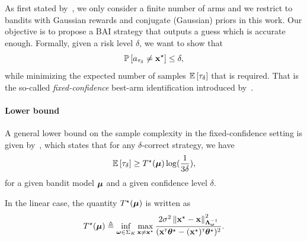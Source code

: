 As first stated by~\cite{soare2014linear}, we only consider a finite number of arms and we restrict to bandits  with Gaussian rewards and conjugate (Gaussian) priors in this work. Our objective is to propose a BAI strategy that outputs a guess which is accurate enough. Formally, given a risk level $\delta$, we want to show that
\[
  \mathbb{P}\left[a_{\tau_\delta}\neq {\bf x}^\star\right] \leq \delta,
\]
while minimizing the expected number of samples $\mathbb{E}\left[\tau_\delta\right]$ that is required. That is the so-called \emph{fixed-confidence} best-arm identification introduced by~\cite{even-dar2003confidence}.

\paragraph{Lower bound} A general lower bound on the sample complexity in the fixed-confidence setting is given by~\cite{garivier2016tracknstop}, which states that for any $\delta$-correct strategy, we have
\[
    \mathbb{E}\left[\tau_\delta\right] \geq T^\star({\boldsymbol \mu})\log(\frac{1}{3\delta}),
\]
for a given bandit model ${\boldsymbol \mu}$ and a given confidence level $\delta$. 

\begin{proposition}
In the linear case, the quantity $T^\star({\boldsymbol \mu})$ is written as
\[
  T^\star({\boldsymbol \mu}) \triangleq \inf_{{\boldsymbol \omega}\in\Sigma_K}\max_{{\bf x}\neq {\bf x}^\star} \frac{2\sigma^2\left\lVert{\bf x}^\star - {\bf x}\right\rVert^2_{{\boldsymbol \Lambda}_{{\boldsymbol \omega}}^{-1}}}{({\bf x}^\mathsf{\scriptscriptstyle T}{\boldsymbol \theta}^\star-({\bf x}^\star)^\mathsf{\scriptscriptstyle T}{\boldsymbol \theta}^\star)^2}.
\]
\end{proposition}

